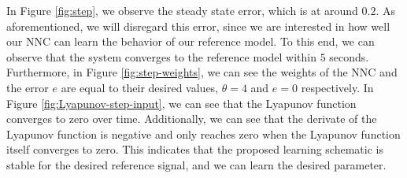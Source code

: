 In Figure \ref{fig:step}, we observe the steady state error, which is at around $0.2$. As aforementioned, we will disregard this error, since we are interested in how well our NNC can learn the behavior of our reference model. To this end, we can observe that the system converges to the reference model within $5$ seconds. Furthermore, in Figure \ref{fig:step-weights}, we can see the weights of the NNC and the error $e$ are equal to their desired values, $\theta=4$ and $e=0$ respectively. In Figure \ref{fig:Lyapunov-step-input}, we can see that the Lyapunov function converges to zero over time. Additionally, we can see that the derivate of the Lyapunov function is negative and only reaches zero when the Lyapunov function itself converges to zero. This indicates that the proposed learning schematic is stable for the desired reference signal, and we can learn the desired parameter.

